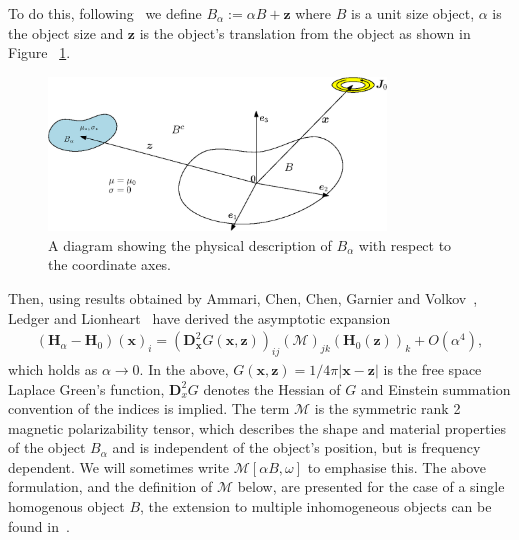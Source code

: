 To do this, following~\cite{Ammari2014,LedgerLionheart2015} we define $B_\alpha := \alpha B + \bm{z}$ where $B$ is a unit size object, $\alpha$ is the object size and $\bm{z}$ is the object's translation from the object as shown in Figure ~\ref{BAlphaShifted}.
\begin{figure}[H]
\begin{center}
\includegraphics[width=0.8\textwidth, keepaspectratio]{Figures/BAlphaShifted.eps}
\caption{A diagram showing the physical description of $B_{\alpha}$ with respect to the coordinate axes.}
\label{BAlphaShifted}
\end{center}
\end{figure}
\noindent Then, using results obtained by Ammari, Chen, Chen, Garnier and Volkov~\cite{Ammari2014}, Ledger and Lionheart~ \cite{LedgerLionheart2015} have derived the
 asymptotic expansion 
\begin{align}
(\bm{H}_{\alpha}-\bm{H}_0)(\bm{x})_i=(\bm{D}_{\bm{x}}^2G(\bm{x},\bm{z}))_{ij}(\mathcal{M})_{jk}(\bm{H}_0(\bm{z}))_k+O(\alpha^4), \label{eqn:asymp}
\end{align}
which holds as $\alpha\to 0$. In the above, $G(\bm{x} ,\bm{z}  ) = 1/ {4\pi | \bm{x} -\bm{z} |}$ is the free space Laplace Green's function, $ \bm{D}^2_x G$ denotes the Hessian of $G$ and Einstein summation convention of the indices is implied. The term ${\mathcal M}$ is the symmetric rank 2 magnetic polarizability tensor, which describes the shape and material properties of the object $B_\alpha $ and is independent of the object's position, but is frequency dependent. We will sometimes write $\mathcal{M}[ \alpha B, \omega ]$ to emphasise this. The above formulation, and the definition of ${\mathcal M}$ below, are presented for the case of a single homogenous object $B$, the extension to multiple inhomogeneous objects can be found in~\cite{LedgerLionheartamad2019,LedgerLionheart2019}.

%

